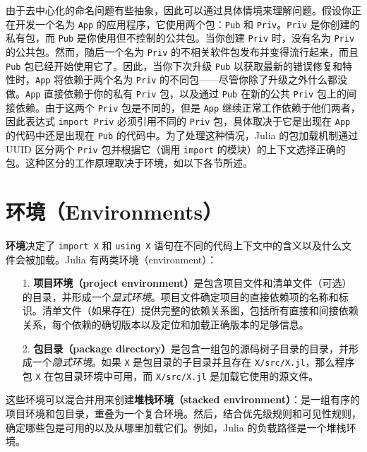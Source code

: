 由于去中心化的命名问题有些抽象，因此可以通过具体情境来理解问题。假设你正在开发一个名为 \texttt{App} 的应用程序，它使用两个包：\texttt{Pub} 和 \texttt{Priv}。\texttt{Priv} 是你创建的私有包，而 \texttt{Pub} 是你使用但不控制的公共包。当你创建 \texttt{Priv} 时，没有名为 \texttt{Priv} 的公共包。然而，随后一个名为 \texttt{Priv} 的不相关软件包发布并变得流行起来，而且 \texttt{Pub} 包已经开始使用它了。因此，当你下次升级 \texttt{Pub} 以获取最新的错误修复和特性时，\texttt{App} 将依赖于两个名为 \texttt{Priv} 的不同包——尽管你除了升级之外什么都没做。\texttt{App} 直接依赖于你的私有 \texttt{Priv} 包，以及通过 \texttt{Pub} 在新的公共 \texttt{Priv} 包上的间接依赖。由于这两个 \texttt{Priv} 包是不同的，但是 \texttt{App} 继续正常工作依赖于他们两者，因此表达式 \texttt{import Priv} 必须引用不同的 \texttt{Priv} 包，具体取决于它是出现在 \texttt{App} 的代码中还是出现在 \texttt{Pub} 的代码中。为了处理这种情况，Julia 的包加载机制通过 UUID 区分两个 \texttt{Priv} 包并根据它（调用 \texttt{import} 的模块）的上下文选择正确的包。这种区分的工作原理取决于环境，如以下各节所述。



\hypertarget{3001628692617530434}{}


\section{环境（Environments）}



\textbf{环境}决定了 \texttt{import X} 和 \texttt{using X} 语句在不同的代码上下文中的含义以及什么文件会被加载。Julia 有两类环境（environment）：



\begin{itemize}
\item[1. ] \textbf{项目环境（project environment）}是包含项目文件和清单文件（可选）的目录，并形成一个\emph{显式环境}。项目文件确定项目的直接依赖项的名称和标识。清单文件（如果存在）提供完整的依赖关系图，包括所有直接和间接依赖关系，每个依赖的确切版本以及定位和加载正确版本的足够信息。


\item[2. ] \textbf{包目录（package directory）}是包含一组包的源码树子目录的目录，并形成一个\emph{隐式环境}。如果 \texttt{X} 是包目录的子目录并且存在 \texttt{X/src/X.jl}，那么程序包 \texttt{X} 在包目录环境中可用，而 \texttt{X/src/X.jl} 是加载它使用的源文件。

\end{itemize}


这些环境可以混合并用来创建\textbf{堆栈环境（stacked environment）}：是一组有序的项目环境和包目录，重叠为一个复合环境。然后，结合优先级规则和可见性规则，确定哪些包是可用的以及从哪里加载它们。例如，Julia 的负载路径是一个堆栈环境。



